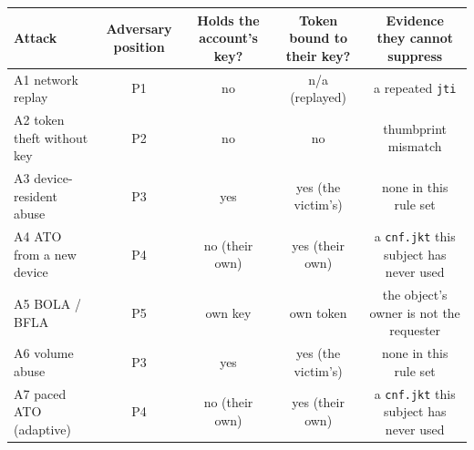 \begin{table}[t]
\centering
\small
\begin{tabular}{lcccc}
\toprule
Attack & Adversary position & Holds the account's key? & Token bound to their key? & Evidence they cannot suppress \\
\midrule
A1 network replay & P1 & no & n/a (replayed) & a repeated \texttt{jti} \\
A2 token theft without key & P2 & no & no & thumbprint mismatch \\
A3 device-resident abuse & P3 & yes & yes (the victim's) & none in this rule set \\
A4 ATO from a new device & P4 & no (their own) & yes (their own) & a \texttt{cnf.jkt} this subject has never used \\
A5 BOLA / BFLA & P5 & own key & own token & the object's owner is not the requester \\
A6 volume abuse & P3 & yes & yes (the victim's) & none in this rule set \\
A7 paced ATO (adaptive) & P4 & no (their own) & yes (their own) & a \texttt{cnf.jkt} this subject has never used \\
\bottomrule
\end{tabular}
\end{table}



